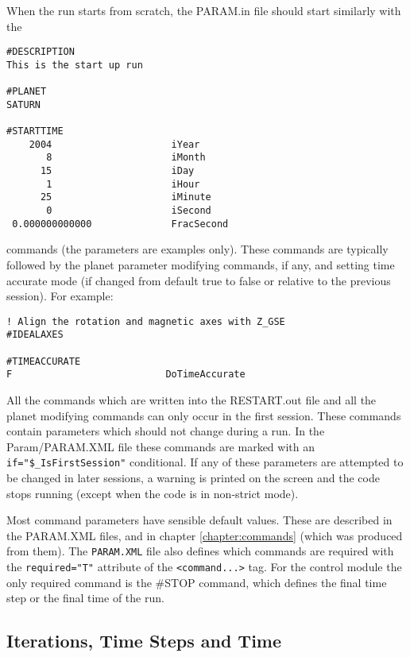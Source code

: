When the run starts from scratch, the PARAM.in file
should start similarly with the 
\begin{verbatim}
#DESCRIPTION
This is the start up run

#PLANET
SATURN

#STARTTIME
    2004                     iYear
       8                     iMonth
      15                     iDay
       1                     iHour
      25                     iMinute
       0                     iSecond
 0.000000000000              FracSecond
\end{verbatim}
commands (the parameters are examples only).
These commands are typically followed by the planet parameter
modifying commands, if any, and setting time accurate mode
(if changed from default true to false or relative to the previous session).
For example:
\begin{verbatim}
! Align the rotation and magnetic axes with Z_GSE
#IDEALAXES

#TIMEACCURATE
F                           DoTimeAccurate
\end{verbatim}
All the commands which are written into the RESTART.out file and all 
the planet modifying commands can only occur in the first session.
These commands contain parameters which should not change during a run.
In the Param/PARAM.XML file these commands are marked with an 
{\tt if="\$\_IsFirstSession"} conditional.
If any of these parameters are attempted to be changed in later sessions, 
a warning is printed on the screen and the code stops running
(except when the code is in non-strict mode).

Most command parameters have sensible default values.
These are described in the PARAM.XML files,
and in chapter \ref{chapter:commands} (which was produced from them).
The {\tt PARAM.XML} file also defines which commands are required
with the {\tt required="T"} attribute of the {\tt <command...>} tag.
For the control module the only required command is the \#STOP command,
which defines the final time step or the final time of the run.

\subsection{Iterations, Time Steps and Time \label{section:frequency}}

